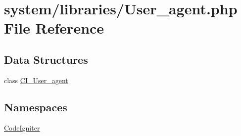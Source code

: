 \hypertarget{_user__agent_8php}{}\section{system/libraries/\+User\+\_\+agent.php File Reference}
\label{_user__agent_8php}
\subsection*{Data Structures}
\begin{DoxyCompactItemize}
\item 
class \mbox{\hyperlink{class_c_i___user__agent}{C\+I\+\_\+\+User\+\_\+agent}}
\end{DoxyCompactItemize}
\subsection*{Namespaces}
\begin{DoxyCompactItemize}
\item 
 \mbox{\hyperlink{namespace_code_igniter}{Code\+Igniter}}
\end{DoxyCompactItemize}
